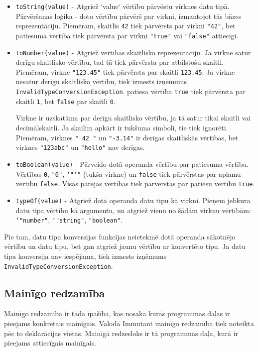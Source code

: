 \documentclass[12pt,a4paper]{report}
\begin{document}
\begin{itemize}
  \item \texttt{toString(value)} - Atgriež `value` vērtību pārvēstu virknes datu tipā.
  Pārvēršanas loģika - doto vērtību pārvērš par virkni, izmantojot tās bāzes reprezentāciju. Piemēram, skaitlis \texttt{42} tiek pārvērsts par virkni \texttt{"42"}, bet patiesuma vērtība tiek pārvērsta par virkni \texttt{"true"} vai \texttt{"false"} attiecīgi. 
  \item \texttt{toNumber(value)} - Atgriež vērtības skaitlisko reprezentāciju. Ja virkne satur derīgu skaitlisko vērtību, tad tā tiek pārvērsta par atbilstošu skaitli. Piemēram, virkne \texttt{"123.45"} tiek pārvērsta par skaitli \texttt{123.45}. Ja virkne nesatur derīgu skaitlisko vērtību, tiek izmests izņēmums \texttt{InvalidTypeConversionException}. patiesa vērtība \texttt{true} tiek pārvērsta par skaitli \texttt{1}, bet \texttt{false} par skaitli \texttt{0}. 
  
  Virkne ir uzskatāma par derīgu skaitlisko vērtību, ja tā satur tikai skaitli vai decimālskaitli. Ja skailim apkārt ir tukšuma simboli, tie tiek ignorēti. Piemēram, virknes \texttt{"  42  "} un \texttt{"-3.14"} ir derīgas skaitliskās vērtības, bet virknes \texttt{"123abc"} un \texttt{"hello"} nav derīgas.
  \item \texttt{toBoolean(value)} - Pārveido dotā operanda vērtību par patiesuma vērtību. Vērtības \texttt{0}, \texttt{"0"}, \texttt{\char`"\char`"} (tukša virkne) un \texttt{false} tiek pārvērstas par aplamu vērtību \texttt{false}. Visas pārējās vērtības tiek pārvērstas par patiesu vērtību \texttt{true}.
  \item \texttt{typeOf(value)} - Atgriež dotā operanda datu tipu kā virkni. Pieņem jebkura datu tipa vērtību kā argumentu, un atgriež vienu no šādām virkņu vērtībām: \texttt{\char`"number"}, \texttt{\char`"string"}, \texttt{"boolean"}.
\end{itemize}

Pie tam, datu tipu konversijas funkcijas neietekmē dotā operanda sākotnējo vērtību un datu tipu, bet gan atgriež jaunu vērtību ar konvertēto tipu. Ja datu tipa konversija nav iespējama, tiek izmests izņēmums \texttt{InvalidTypeConversionException}.

\subsection{Mainīgo redzamība}
Mainīgo redzamība ir tāda īpašība, kas nosaka kurās programmas daļas ir pieejams konkrētais mainīgais. Valodā Immutant mainīgo redzamība tiek noteikta pēc to deklarācijas vietas. Mainīgā redzesloks ir tā programmas daļa, kurā ir pieejams attiecīgais mainīgais.
\end{document}
